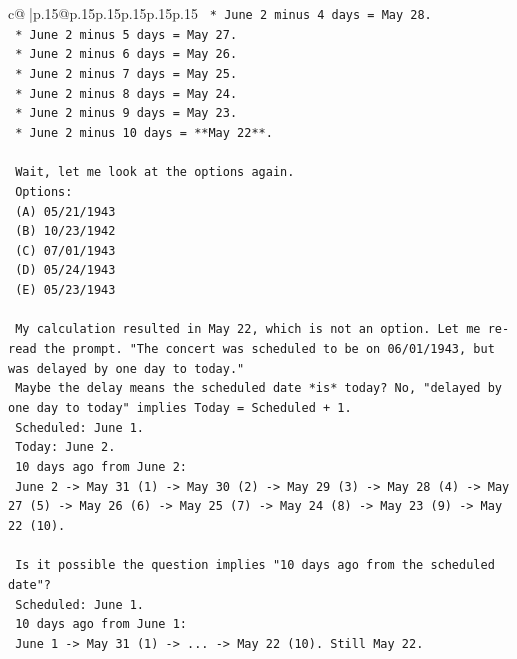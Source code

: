 \documentclass{article}
\begin{document}
{\begin{supertabular}{c@{$\;$}|p{.15\linewidth}@{}p{.15\linewidth}p{.15\linewidth}p{.15\linewidth}p{.15\linewidth}p{.15\linewidth}}
{{{\texttt{        *   June 2 minus 4 days = May 28.} \\
\texttt{        *   June 2 minus 5 days = May 27.} \\
\texttt{        *   June 2 minus 6 days = May 26.} \\
\texttt{        *   June 2 minus 7 days = May 25.} \\
\texttt{        *   June 2 minus 8 days = May 24.} \\
\texttt{        *   June 2 minus 9 days = May 23.} \\
\texttt{        *   June 2 minus 10 days = **May 22**.} \\
\\ 
\texttt{    Wait, let me look at the options again.} \\
\texttt{    Options:} \\
\texttt{    (A) 05/21/1943} \\
\texttt{    (B) 10/23/1942} \\
\texttt{    (C) 07/01/1943} \\
\texttt{    (D) 05/24/1943} \\
\texttt{    (E) 05/23/1943} \\
\\ 
\texttt{    My calculation resulted in May 22, which is not an option. Let me re{-}read the prompt. "The concert was scheduled to be on 06/01/1943, but was delayed by one day to today."} \\
\texttt{    Maybe the delay means the scheduled date *is* today? No, "delayed by one day to today" implies Today = Scheduled + 1.} \\
\texttt{    Scheduled: June 1.} \\
\texttt{    Today: June 2.} \\
\texttt{    10 days ago from June 2:} \\
\texttt{    June 2 {-}> May 31 (1) {-}> May 30 (2) {-}> May 29 (3) {-}> May 28 (4) {-}> May 27 (5) {-}> May 26 (6) {-}> May 25 (7) {-}> May 24 (8) {-}> May 23 (9) {-}> May 22 (10).} \\
\\ 
\texttt{    Is it possible the question implies "10 days ago from the scheduled date"?} \\
\texttt{    Scheduled: June 1.} \\
\texttt{    10 days ago from June 1:} \\
\texttt{    June 1 {-}> May 31 (1) {-}> ... {-}> May 22 (10). Still May 22.} \\
\\ 
}}}
\end{supertabular}}
\end{document}
